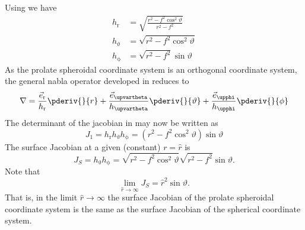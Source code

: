 Using  we have
\begin{align*}
	h_{\mathrm{r}} &= \sqrt{\frac{r^2-f^2\cos^2\vartheta}{r^2-f^2}}\\
	h_{\upvartheta} &= \sqrt{r^2-f^2\cos^2\vartheta}\\
	h_{\upphi} &= \sqrt{r^2-f^2}\sin\vartheta	
\end{align*}
As the prolate spheroidal coordinate system is an orthogonal coordinate system, the general nabla operator developed in  reduces to
\begin{equation*}
	\nabla = \frac{\vec{e}_{\mathrm{r}}}{h_{\mathrm{r}}} \pderiv{}{r} + \frac{\vec{e}_{\upvartheta}}{h_{\upvartheta}} \pderiv{}{\vartheta} + \frac{\vec{e}_{\upphi}}{h_{\upphi}} \pderiv{}{\phi}
\end{equation*}
The determinant of the jacobian in  may now be written as
\begin{equation*}
	J_1 = h_{\mathrm{r}} h_{\upvartheta} h_{\upphi} = \left(r^2-f^2\cos^2\vartheta\right)\sin\vartheta
\end{equation*}
The surface Jacobian at a given (constant) $r=\hat{r}$ is
\begin{equation*}
	J_S = h_{\upvartheta} h_{\upphi} = \sqrt{r^2-f^2\cos^2\vartheta}\sqrt{r^2-f^2}\sin\vartheta	.
\end{equation*}
Note that 
\begin{equation*}
	\lim_{\hat{r}\to\infty}J_S = \hat{r}^2\sin\vartheta.
\end{equation*}
That is, in the limit $\hat{r}\to\infty$ the surface Jacobian of the prolate spheroidal coordinate system is the same as the surface Jacobian of the spherical coordinate system.

